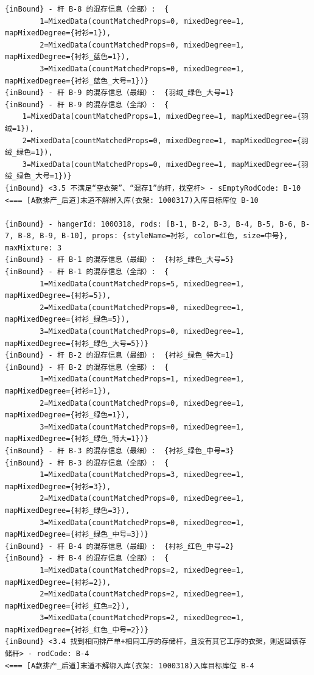 {\begin{verbatim}
{inBound} - 杆 B-8 的混存信息（全部）:  {
		1=MixedData(countMatchedProps=0, mixedDegree=1, mapMixedDegree={衬衫=1}), 
		2=MixedData(countMatchedProps=0, mixedDegree=1, mapMixedDegree={衬衫_蓝色=1}), 
		3=MixedData(countMatchedProps=0, mixedDegree=1, mapMixedDegree={衬衫_蓝色_大号=1})}
{inBound} - 杆 B-9 的混存信息（最细）:  {羽绒_绿色_大号=1}
{inBound} - 杆 B-9 的混存信息（全部）:  {
	1=MixedData(countMatchedProps=1, mixedDegree=1, mapMixedDegree={羽绒=1}), 
	2=MixedData(countMatchedProps=0, mixedDegree=1, mapMixedDegree={羽绒_绿色=1}), 
	3=MixedData(countMatchedProps=0, mixedDegree=1, mapMixedDegree={羽绒_绿色_大号=1})}
{inBound} <3.5 不满足“空衣架”、“混存1”的杆，找空杆> - sEmptyRodCode: B-10
<=== [A款排产_后道]末道不解绑入库(衣架: 1000317)入库目标库位 B-10

{inBound} - hangerId: 1000318, rods: [B-1, B-2, B-3, B-4, B-5, B-6, B-7, B-8, B-9, B-10], props: {styleName=衬衫, color=红色, size=中号}, maxMixture: 3
{inBound} - 杆 B-1 的混存信息（最细）:  {衬衫_绿色_大号=5}
{inBound} - 杆 B-1 的混存信息（全部）:  {
		1=MixedData(countMatchedProps=5, mixedDegree=1, mapMixedDegree={衬衫=5}), 
		2=MixedData(countMatchedProps=0, mixedDegree=1, mapMixedDegree={衬衫_绿色=5}), 
		3=MixedData(countMatchedProps=0, mixedDegree=1, mapMixedDegree={衬衫_绿色_大号=5})}
{inBound} - 杆 B-2 的混存信息（最细）:  {衬衫_绿色_特大=1}
{inBound} - 杆 B-2 的混存信息（全部）:  {
		1=MixedData(countMatchedProps=1, mixedDegree=1, mapMixedDegree={衬衫=1}), 
		2=MixedData(countMatchedProps=0, mixedDegree=1, mapMixedDegree={衬衫_绿色=1}), 
		3=MixedData(countMatchedProps=0, mixedDegree=1, mapMixedDegree={衬衫_绿色_特大=1})}
{inBound} - 杆 B-3 的混存信息（最细）:  {衬衫_绿色_中号=3}
{inBound} - 杆 B-3 的混存信息（全部）:  {
		1=MixedData(countMatchedProps=3, mixedDegree=1, mapMixedDegree={衬衫=3}), 
		2=MixedData(countMatchedProps=0, mixedDegree=1, mapMixedDegree={衬衫_绿色=3}), 
		3=MixedData(countMatchedProps=0, mixedDegree=1, mapMixedDegree={衬衫_绿色_中号=3})}
{inBound} - 杆 B-4 的混存信息（最细）:  {衬衫_红色_中号=2}
{inBound} - 杆 B-4 的混存信息（全部）:  {
		1=MixedData(countMatchedProps=2, mixedDegree=1, mapMixedDegree={衬衫=2}), 
		2=MixedData(countMatchedProps=2, mixedDegree=1, mapMixedDegree={衬衫_红色=2}), 
		3=MixedData(countMatchedProps=2, mixedDegree=1, mapMixedDegree={衬衫_红色_中号=2})}
{inBound} <3.4 找到相同排产单+相同工序的存储杆，且没有其它工序的衣架，则返回该存储杆> - rodCode: B-4
<=== [A款排产_后道]末道不解绑入库(衣架: 1000318)入库目标库位 B-4


\end{verbatim}}

